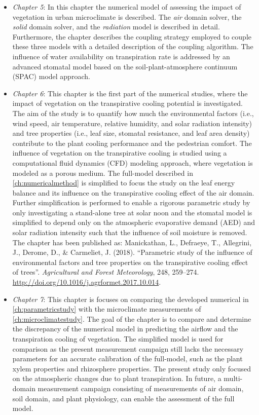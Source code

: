 \begin{itemize}
	\item \textit{Chapter 5}: In this chapter the numerical model of assessing the impact of vegetation in urban microclimate is described. The \textit{air} domain solver, the \textit{solid} domain solver, and the \textit{radiation} model is described in detail. Furthermore, the chapter describes the coupling strategy employed to couple these three models with a detailed description of the coupling algorithm. The influence of water availability on transpiration rate is addressed by an advanced stomatal model based on the soil-plant-atmosphere continuum (SPAC) model approach. 

	\item \textit{Chapter 6}: This chapter is the first part of the numerical studies, where the impact of vegetation on the transpirative cooling potential is investigated. The aim of the study is to quantify how much the environmental factors (i.e., wind speed, air temperature, relative humidity, and solar radiation intensity) and tree properties (i.e., leaf size, stomatal resistance, and leaf area density) contribute to the plant cooling performance and the pedestrian comfort. The influence of vegetation on the transpirative cooling is studied using a computational fluid dynamics (CFD) modeling approach, where vegetation is modeled as a porous medium. The full-model described in \cref{ch:numericalmethod} is simplified to focus the study on the leaf energy balance and its influence on the transpirative cooling effect of the air domain. Further simplification is performed to enable a rigorous parametric study by only investigating a stand-alone tree at solar noon and the stomatal model is simplified to depend only on the atmospheric evaporative demand (AED) and solar radiation intensity such that the influence of soil moisture is removed. The chapter has been published as: Manickathan, L., Defraeye, T., Allegrini, J., Derome, D., \& Carmeliet, J. (2018). ``Parametric study of the influence of environmental factors and tree properties on the transpirative cooling effect of trees''. \textit{Agricultural and Forest Meteorology}, 248, 259–274. \url{http://doi.org/10.1016/j.agrformet.2017.10.014}.

	\item \textit{Chapter 7}: This chapter is focuses on comparing the developed numerical in \cref{ch:parametricstudy} with the microclimate measurements of \cref{ch:microclimatestudy}. The goal of the chapter is to compare and determine the discrepancy of the numerical model in predicting the airflow and the transpiration cooling of vegetation. The simplified model is used for comparison as the present measurement campaign still lacks the necessary parameters for an accurate calibration of the full-model, such as the plant xylem properties and rhizosphere properties. The present study only focused on the atmospheric changes due to plant transpiration. In future, a multi-domain measurement campaign consisting of measurements of air domain, soil domain, and plant physiology, can enable the assessment of the full model.


\end{itemize}
